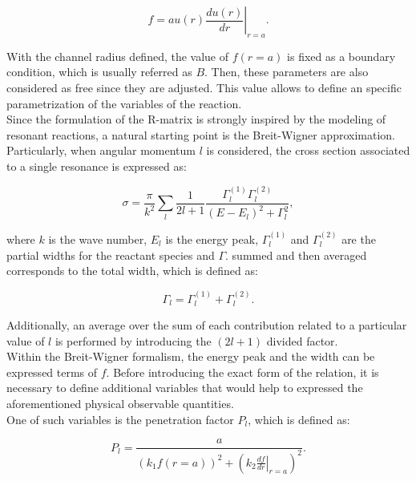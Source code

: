 \documentclass[openany]{book}
\begin{document}
\begin{equation}\label{eq:rmatrix_f}
	f = a\left.u(r) \frac{du(r)}{dr}\right|_{r = a}.
\end{equation}

With the channel radius defined, the value of $f(r = a)$ is fixed as a boundary condition, which is usually referred as $B$.  Then, these parameters are also considered as free since they are adjusted. This value allows to define an specific parametrization of the variables of the reaction. \\

Since the formulation of the R-matrix is strongly inspired by the modeling of resonant reactions, a natural starting point is the Breit-Wigner approximation. Particularly, when angular momentum $l$ is considered, the cross section associated to a single resonance is expressed as:

\begin{equation}  \label{eq:rmatrix_breitWigner}
	\sigma = \frac{\pi}{k^2} \sum_{l} \frac{1}{2l + 1} \frac{\Gamma^{(1)}_{l} \Gamma^{(2)}_{l} }{(E - E_l)^2  + \Gamma^2_l }, 
\end{equation}

where $k$ is the wave number, $E_l$ is the energy peak,  $\Gamma^{(1)}_{l}$ and $\Gamma^{(2)}_{l}$ are the partial widths for the reactant species and $\Gamma$. summed and then averaged corresponds to the total width, which is defined as: 

\begin{equation}  \label{eq:rmatrix_totalWidth}
	\Gamma_l = \Gamma^{(1)}_{l} + \Gamma^{(2)}_{l}. 
\end{equation}

Additionally, an average over the sum of each contribution related to a particular value of $l$ is performed by introducing the $(2l +1)$ divided factor. \\

Within the Breit-Wigner formalism, the energy peak and the width can be expressed terms of $f$. Before introducing the exact form of the relation, it is necessary to define additional variables that would help to expressed the aforementioned physical observable quantities.  \\

One of such variables is the penetration factor $P_l$, which is defined as: 

\begin{equation}  \label{eq:rmatrix_penetrationFactor}
	P_l = \frac{a}{(k_1 f(r = a ))^2 + \left(k_2 \left.\frac{df}{dr}\right|_{r = a} \right)^2 }.
\end{equation}
\end{document}
